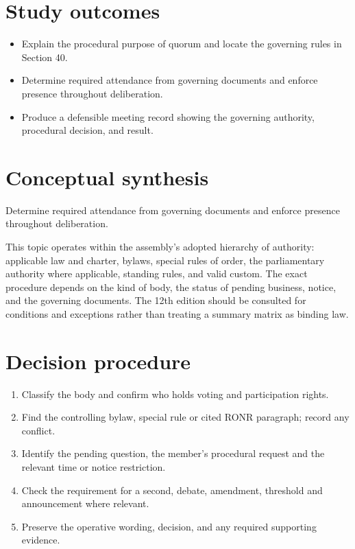 \documentclass[11pt]{article}
\begin{document}
\SuiteOpen
{}
\section{Study outcomes}
\begin{itemize}[leftmargin=*,itemsep=4pt]
\item Explain the procedural purpose of quorum and locate the governing rules in Section 40.
\item Determine required attendance from governing documents and enforce presence throughout deliberation.
\item Produce a defensible meeting record showing the governing authority, procedural decision, and result.
\end{itemize}

\section{Conceptual synthesis}
Determine required attendance from governing documents and enforce presence throughout deliberation.

This topic operates within the assembly’s adopted hierarchy of authority: applicable law and charter, bylaws, special rules of order, the parliamentary authority where applicable, standing rules, and valid custom. The exact procedure depends on the kind of body, the status of pending business, notice, and the governing documents. The 12th edition should be consulted for conditions and exceptions rather than treating a summary matrix as binding law.
\section{Decision procedure}
\begin{enumerate}[leftmargin=*,itemsep=4pt]
\item Classify the body and confirm who holds voting and participation rights.
\item Find the controlling bylaw, special rule or cited RONR paragraph; record any conflict.
\item Identify the pending question, the member’s procedural request and the relevant time or notice restriction.
\item Check the requirement for a second, debate, amendment, threshold and announcement where relevant.
\item Preserve the operative wording, decision, and any required supporting evidence.
\end{enumerate}
\end{document}
